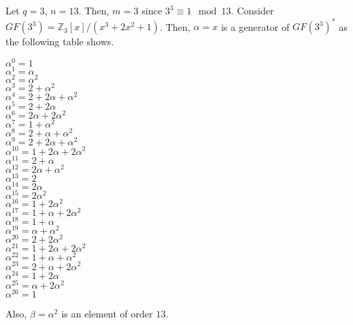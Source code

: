 \begin{exbox}
    \begin{example}
        Let $ q=3 $, $ n=13 $. Then, $ m=3 $ since $ 3^3\equiv 1\mod 13 $.
        Consider $ GF(3^3)=\mathbb{Z}_3[x]/(x^3+2x^2+1) $.
        Then, $ \alpha=x $ is a generator of $ GF(3^3)^* $
        as the following table shows.
        \begin{center}
            \begin{multicols}{3}
                $ \alpha^0=1 $ \\
                $ \alpha^1=\alpha $\\
                $ \alpha^2=\alpha^2 $\\
                $ \alpha^3=2+\alpha^2 $\\
                $ \alpha^4=2+2\alpha+\alpha^2 $\\
                $ \alpha^5=2+2\alpha $\\
                $ \alpha^6=2\alpha+2\alpha^2 $\\
                $ \alpha^7=1+\alpha^2 $\\
                $ \alpha^8=2+\alpha+\alpha^2 $\\
                $ \alpha^9=2+2\alpha+\alpha^2 $\\
                $ \alpha^{10}=1+2\alpha+2\alpha^2 $\\
                $ \alpha^{11}=2+\alpha $\\
                $ \alpha^{12}=2\alpha+\alpha^2 $\\
                $ \alpha^{13}=2 $\\
                $ \alpha^{14}=2\alpha $\\
                $ \alpha^{15}=2\alpha^2 $\\
                $ \alpha^{16}=1+2\alpha^2 $\\
                $ \alpha^{17}=1+\alpha+2\alpha^2 $\\
                $ \alpha^{18}=1+\alpha  $\\
                $ \alpha^{19}=\alpha+\alpha^2 $\\
                $ \alpha^{20}=2+2\alpha^2 $\\
                $ \alpha^{21}=1+2\alpha+2\alpha^2 $\\
                $ \alpha^{22}=1+\alpha+\alpha^2 $\\
                $ \alpha^{23}=2+\alpha+2\alpha^2 $\\
                $ \alpha^{24}=1+2\alpha $\\
                $ \alpha^{25}=\alpha+2\alpha^{2} $\\
                $ \alpha^{26}=1 $
            \end{multicols}
        \end{center}
        Also, $ \beta=\alpha^2 $ is an element of order $ 13 $.


\end{example}
\end{exbox}
